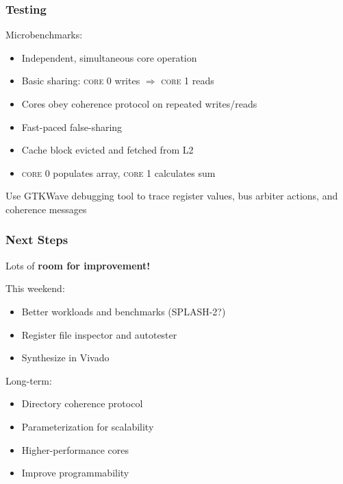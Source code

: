 \documentclass{beamer}
\begin{document}
\begin{frame} 
  \frametitle{Testing}
  Microbenchmarks:
  \begin{itemize}
    \item Independent, simultaneous core operation
    \item Basic sharing: \textsc{core 0} writes $\Rightarrow$ \textsc{core 1} reads
    \item Cores obey coherence protocol on repeated writes/reads
    \item Fast-paced false-sharing 
    \item Cache block evicted and fetched from L2 
    \item \textsc{core 0} populates array, \textsc{core 1} calculates sum
  \end{itemize}

\begin{tcolorbox}[colback=graphcolor,colframe=graphcolor!75!black]
  \begin{center}
    Use GTKWave debugging tool to trace register values, bus arbiter actions, and coherence messages
  \end{center}
\end{tcolorbox}

  
\end{frame}



\begin{frame} 

  \frametitle{Next Steps}
    \begin{tcolorbox}[colback=indiagreen!40!white,colframe=indiagreen!75!black]
      \begin{center}
        Lots of \textbf{room for improvement!}
      \end{center}
    \end{tcolorbox}
  This weekend:
  \begin{itemize}
    \item Better workloads and benchmarks (SPLASH-2?)
    \item Register file inspector and autotester
    \item Synthesize in Vivado
  \end{itemize}

  Long-term:
  \begin{itemize}
    \item Directory coherence protocol
    \item Parameterization for scalability
    \item Higher-performance cores
    \item Improve programmability
  \end{itemize}
  

\end{frame}
\end{document}
